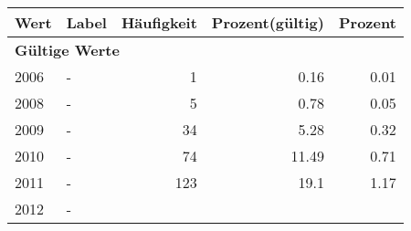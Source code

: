      \begin{longtable}{lXrrr}
     \toprule
     \textbf{Wert} & \textbf{Label} & \textbf{Häufigkeit} & \textbf{Prozent(gültig)} & \textbf{Prozent} \\
     \endhead
     \midrule
     \multicolumn{5}{l}{\textbf{Gültige Werte}}\\

     2006 &
     \multicolumn{1}{X}{ -  } &


       \num{1} &
       \num[round-mode=places,round-precision=2]{0,16} &
         \num[round-mode=places,round-precision=2]{0,01} \\

     2008 &
     \multicolumn{1}{X}{ -  } &


       \num{5} &
       \num[round-mode=places,round-precision=2]{0,78} &
         \num[round-mode=places,round-precision=2]{0,05} \\

     2009 &
     \multicolumn{1}{X}{ -  } &


       \num{34} &
       \num[round-mode=places,round-precision=2]{5,28} &
         \num[round-mode=places,round-precision=2]{0,32} \\

     2010 &
     \multicolumn{1}{X}{ -  } &


       \num{74} &
       \num[round-mode=places,round-precision=2]{11,49} &
         \num[round-mode=places,round-precision=2]{0,71} \\

     2011 &
     \multicolumn{1}{X}{ -  } &


       \num{123} &
       \num[round-mode=places,round-precision=2]{19,1} &
         \num[round-mode=places,round-precision=2]{1,17} \\

     2012 &
     \multicolumn{1}{X}{ -  } &



\end{longtable}
